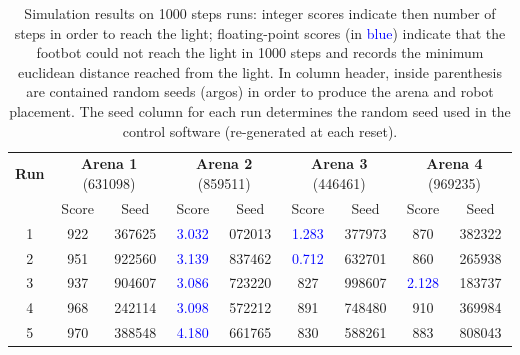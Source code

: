 \begin{table}[ht]
\centering
\begin{tabular}{c|cc|cc|cc|cc}
\textbf{Run} & \multicolumn{2}{c|}{\textbf{Arena 1} (631098)} & \multicolumn{2}{c|}{\textbf{Arena 2} (859511)} & \multicolumn{2}{c|}{\textbf{Arena 3} (446461)} & \multicolumn{2}{c}{\textbf{Arena 4} (969235)} \\
 & Score & Seed & Score & Seed & Score & Seed & Score & Seed \\
\hline
1 & 922 & 367625 & \textcolor{blue}{3.032} & 072013 & \textcolor{blue}{1.283} & 377973 & 870 & 382322 \\
2 & 951 & 922560 & \textcolor{blue}{3.139} & 837462 & \textcolor{blue}{0.712} & 632701 & 860 & 265938 \\
3 & 937 & 904607 & \textcolor{blue}{3.086} & 723220 & 827 & 998607 & \textcolor{blue}{2.128} & 183737 \\
4 & 968 & 242114 & \textcolor{blue}{3.098} & 572212 & 891 & 748480 & 910 & 369984 \\
5 & 970 & 388548 & \textcolor{blue}{4.180} & 661765 & 830 & 588261 & 883 & 808043 \\
\end{tabular}
\caption{Simulation results on 1000 steps runs: integer scores indicate then
    number of steps in order to reach the light; floating-point scores (in
    \textcolor{blue}{blue}) indicate that the footbot could not reach the light
    in 1000 steps and records the minimum euclidean distance reached from the
    light. In column header, inside parenthesis are contained random seeds
    (argos) in order to produce the arena and robot placement. The seed column for
    each run determines the random seed used in the control software (re-generated
    at each reset).}
\label{tab:simulation-results-sub}
\end{table}
